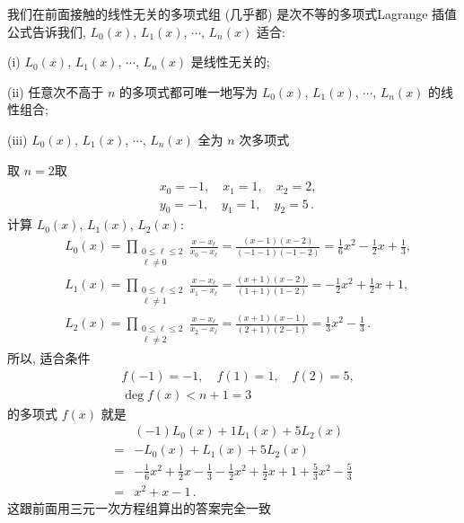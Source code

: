 \begin{remark}
    我们在前面接触的线性无关的多项式组 (几乎都) 是次不等的多项式\period Lagrange 插值公式告诉我们, $L_0 (x)$, $L_1 (x)$, $\cdots$, $L_n (x)$ 适合:

    (i) $L_0 (x)$, $L_1 (x)$, $\cdots$, $L_n (x)$ 是线性无关的;

    (ii) 任意次不高于 $n$ 的多项式都可唯一地写为 $L_0 (x)$, $L_1 (x)$, $\cdots$, $L_n (x)$ 的线性组合;

    (iii) $L_0 (x)$, $L_1 (x)$, $\cdots$, $L_n (x)$ 全为 $n$ 次多项式\period
\end{remark}

\begin{example}
    取 $n = 2$\period 取
    \begin{align*}
         & x_0 = -1, \quad x_1 = 1, \quad x_2 = 2,        \\
         & y_0 = -1, \quad y_1 = 1, \quad y_2 = 5 \period
    \end{align*}
    计算 $L_0 (x)$, $L_1 (x)$, $L_2 (x)$:
    \begin{align*}
         & L_0 (x) = \prod_{\begin{smallmatrix}0 \leq \ell \leq 2 \\\ell \neq 0\end{smallmatrix}} \frac{x - x_\ell}{x_0 - x_\ell} = \frac{(x - 1)(x - 2)}{(-1 - 1)(-1 - 2)} = \frac16 x^2 - \frac12 x + \frac13, \\
         & L_1 (x) = \prod_{\begin{smallmatrix}0 \leq \ell \leq 2 \\\ell \neq 1\end{smallmatrix}} \frac{x - x_\ell}{x_1 - x_\ell} = \frac{(x + 1)(x - 2)}{(1 + 1)(1 - 2)} = -\frac12 x^2 + \frac12 x + 1,        \\
         & L_2 (x) = \prod_{\begin{smallmatrix}0 \leq \ell \leq 2 \\\ell \neq 2\end{smallmatrix}} \frac{x - x_\ell}{x_2 - x_\ell} = \frac{(x + 1)(x - 1)}{(2 + 1)(2 - 1)} = \frac13 x^2 - \frac13 \period
    \end{align*}
    所以, 适合条件
    \begin{align*}
         & f(-1) = -1, \quad f(1) = 1, \quad f(2) = 5, \\
         & \deg f(x) < n + 1 = 3
    \end{align*}
    的多项式 $f(x)$ 就是
    \begin{align*}
             & (-1)L_0 (x) + 1L_1 (x) + 5L_2 (x)  \\
        = {} & -L_0 (x) + L_1 (x) + 5L_2 (x)      \\
        = {} & -\frac16 x^2 + \frac12 x - \frac13
        - \frac12 x^2 + \frac12 x + 1
        + \frac53 x^2 - \frac53                   \\
        = {} & x^2 + x - 1 \period
    \end{align*}
    这跟前面用三元一次方程组算出的答案完全一致\period
\end{example}

